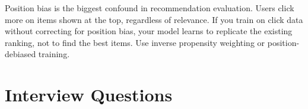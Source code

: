 \begin{warningbox}
Position bias is the biggest confound in recommendation evaluation. Users click more on items shown at the top, regardless of relevance. If you train on click data without correcting for position bias, your model learns to replicate the existing ranking, not to find the best items. Use inverse propensity weighting or position-debiased training.
\end{warningbox}

\section{Interview Questions}
\label{sec:recsys_interview}


